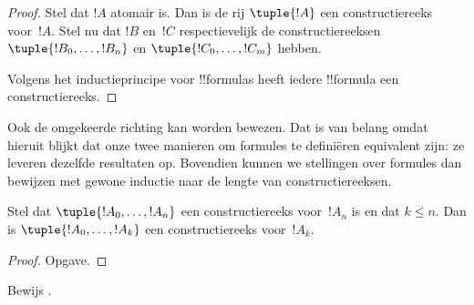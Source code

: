 \documentclass[../../../include/open-logic-section]{subfiles}
\begin{document}
\begin{proof}
Stel dat $!A$ atomair is. Dan is de rij $\tuple{!A}$ een
constructiereeks voor~$!A$.
%
Stel nu dat $!B$ en~$!C$ respectievelijk de constructiereeksen
$\tuple{!B_0,\dotsc,!B_n}$ en $\tuple{!C_0,\dotsc,!C_m}$
hebben.
%
\begin{enumerate}
\end{enumerate}
Volgens het inductieprincipe voor !!{formula}s heeft iedere
!!{formula} een constructiereeks.
\end{proof}

Ook de omgekeerde richting kan worden bewezen. Dat is van belang omdat
hieruit blijkt dat onze twee manieren om formules te definiëren
equivalent zijn: ze leveren dezelfde resultaten op. Bovendien kunnen we
stellingen over formules dan bewijzen met gewone inductie naar de lengte
van constructiereeksen.

\begin{lem}
Stel dat $\tuple{!A_0,\dotsc,!A_n}$ een constructiereeks voor~$!A_n$
is en dat $k \leq n$. Dan is $\tuple{!A_0,\dotsc,!A_k}$ een
constructiereeks voor~$!A_k$.
\end{lem}

\begin{proof}
Opgave.
\end{proof}

\begin{prob}
Bewijs .
\end{prob}
\end{document}
